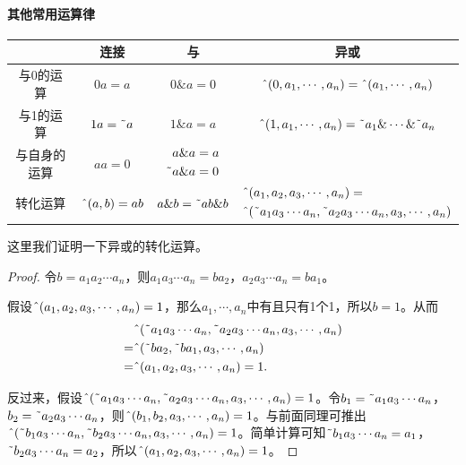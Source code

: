 \paragraph*{其他常用运算律}
\begin{center}
  \begin{tabular}{|c|c|c|c|}
    \hline
    &连接&与&异或\\\hline
    与0的运算&$0a=a$&$0\&a=0$&$\textrm{\^{}}(0,a_1,\cdots,a_n)=\textrm{\^{}}(a_1,\cdots,a_n)$\\\hline
    与1的运算&$1a=\textrm{\~{}} a$&$1\&a=a$&$\textrm{\^{}}(1,a_1,\cdots,a_n)=\textrm{\~{}} a_1\&\cdots\&\textrm{\~{}} a_n$\\\hline
    与自身的运算&$aa=0$&$\begin{aligned}a\& a&=a\\\textrm{\~{}} a\& a&=0\end{aligned}$&\\\hline
    转化运算&$\textrm{\^{}}(a,b)=ab$&$a\&b=\textrm{\~{}} ab\&b$&$\begin{aligned}[]&\textrm{\^{}}(a_1,a_2,a_3,\cdots,a_n)=\\&\textrm{\^{}}(\textrm{\~{}} a_1a_3\cdots a_n,\textrm{\~{}} a_2a_3\cdots a_n,a_3,\cdots,a_n)\end{aligned}$\\\hline
  \end{tabular}
\end{center}

这里我们证明一下异或的转化运算。
\begin{proof}
  令$b=a_1a_2\cdots a_n$，则$a_1a_3\cdots a_n=ba_2$，$a_2a_3\cdots a_n=ba_1$。

  假设$\textrm{\^{}}(a_1,a_2,a_3,\cdots,a_n)=1$，那么$a_1,\cdots,a_n$中有且只有1个1，所以$b=1$。从而
  \[
    \begin{split}
        & \textrm{\^{}}(\textrm{\~{}} a_1a_3\cdots a_n,\textrm{\~{}} a_2a_3\cdots a_n,a_3,\cdots,a_n) \\
      = & \textrm{\^{}}(\textrm{\~{}}ba_2,\textrm{\~{}}ba_1,a_3,\cdots,a_n) \\
      = & \textrm{\^{}}(a_1,a_2,a_3,\cdots,a_n)=1.
    \end{split}
  \]

  反过来，假设$\textrm{\^{}}(\textrm{\~{}} a_1a_3\cdots a_n,\textrm{\~{}} a_2a_3\cdots a_n,a_3,\cdots,a_n)=1$。令$b_1=\textrm{\~{}} a_1a_3\cdots a_n$，$b_2=\textrm{\~{}} a_2a_3\cdots a_n$，则$\textrm{\^{}}(b_1,b_2,a_3,\cdots,a_n)=1$。与前面同理可推出$\textrm{\^{}}(\textrm{\~{}} b_1a_3\cdots a_n,\textrm{\~{}} b_2a_3\cdots a_n,a_3,\cdots,a_n)=1$。简单计算可知$\textrm{\~{}} b_1a_3\cdots a_n=a_1$，$\textrm{\~{}} b_2a_3\cdots a_n=a_2$，所以$\textrm{\^{}}(a_1,a_2,a_3,\cdots,a_n)=1$。
\end{proof}

